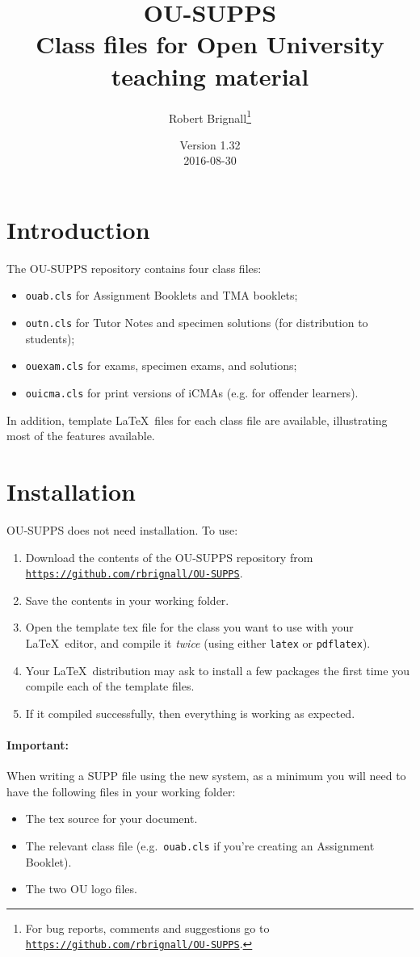 \documentclass[a4paper]{ltxguide}
\title{\textsf{OU-SUPPS}\\Class files for Open University teaching material}
\author{Robert Brignall\footnote{For bug reports, comments and
suggestions go to \href{https://github.com/rbrignall/OU-SUPPS}%
{\texttt{https://github.com/rbrignall/OU-SUPPS}}.}}
\date{Version 1.32\\2016-08-30}
\newcommand\3{\unskip\enspace\fbox{\fontsize{4}{4}\selectfont NEW 3.0}}
\begin{document}
\maketitle

\tableofcontents

\section{Introduction}

The \textsf{OU-SUPPS} repository contains four class files:
\begin{itemize}
\item \texttt{ouab.cls} for Assignment Booklets and TMA booklets;
\item \texttt{outn.cls} for Tutor Notes and specimen solutions (for distribution to students);
\item \texttt{ouexam.cls} for exams, specimen exams, and solutions;
\item \texttt{ouicma.cls} for print versions of iCMAs (e.g. for offender learners).
\end{itemize}

In addition, template \LaTeX\ files for each class file are available, illustrating most of the features available.

\section{Installation}

\textsf{OU-SUPPS} does not need installation. To use:

\begin{enumerate}
\item Download the contents of the \textsf{OU-SUPPS} repository from \href{https://github.com/rbrignall/OU-SUPPS}%
{\texttt{https://github.com/rbrignall/OU-SUPPS}}.
\item Save the contents in your working folder.
\item Open the template tex file for the class you want to use with your \LaTeX\ editor, and compile it \emph{twice} (using either \texttt{latex} or \texttt{pdflatex}). 
\item Your \LaTeX\ distribution may ask to install a few packages the first time you compile each of the template files.
\item If it compiled successfully, then everything is working as expected.
\end{enumerate}

\paragraph{Important:} When writing a SUPP file using the new system, as a minimum you will need to have the following files in your working folder:
\begin{itemize}
\item The tex source for your document.
\item The relevant class file (e.g.\ \texttt{ouab.cls} if you're creating an Assignment Booklet).
\item The two OU logo files.
\end{itemize}
\end{document}
